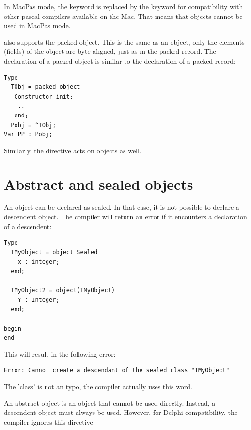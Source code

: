 \begin{remark}
In MacPas mode, the  keyword is replaced by the 
keyword for compatibility with other pascal compilers available on the Mac.
That means that objects cannot be used in MacPas mode.
\end{remark}
\begin{remark}
\fpc also supports the packed object. This is the same as an object, only
the elements (fields) of the object are byte-aligned, just as in the packed
record.
The declaration of a packed object is similar to the declaration
of a packed record:
\begin{verbatim}
Type
  TObj = packed object
   Constructor init;
   ...
   end;
  Pobj = ^TObj;
Var PP : Pobj;
\end{verbatim}
Similarly, the  directive acts on objects as well.
\end{remark}

\section{Abstract and sealed objects}

An object can be declared as sealed. In that case, it is not possible to declare a descendent
object. The compiler will return an error if it encounters a declaration of a descendent:
\begin{verbatim}
Type
  TMyObject = object Sealed
    x : integer;
  end;

  TMyObject2 = object(TMyObject)
    Y : Integer;
  end;

begin
end.
\end{verbatim}

This will result in the following error:
\begin{verbatim}
Error: Cannot create a descendant of the sealed class "TMyObject"
\end{verbatim}
The 'class' is not an typo, the compiler actually uses this word.

An abstract object is an object that cannot be used directly.
Instead, a descendent object must always be used.
However, for Delphi compatibility, the compiler ignores this directive.

